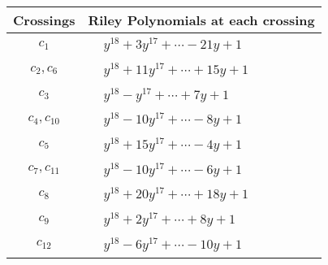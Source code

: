 \documentclass[1p]{elsarticle_modified}
\theoremstyle{definition}
\begin{document}
\begin{tabular}{m{50pt}|m{274pt}}
Crossings & \hspace{64pt}Riley Polynomials at each crossing \\
\hline $$\begin{aligned}c_{1}\end{aligned}$$&$\begin{aligned}
&y^{18}+3 y^{17}+\cdots-21 y+1
\end{aligned}$\\
\hline $$\begin{aligned}c_{2},c_{6}\end{aligned}$$&$\begin{aligned}
&y^{18}+11 y^{17}+\cdots+15 y+1
\end{aligned}$\\
\hline $$\begin{aligned}c_{3}\end{aligned}$$&$\begin{aligned}
&y^{18}- y^{17}+\cdots+7 y+1
\end{aligned}$\\
\hline $$\begin{aligned}c_{4},c_{10}\end{aligned}$$&$\begin{aligned}
&y^{18}-10 y^{17}+\cdots-8 y+1
\end{aligned}$\\
\hline $$\begin{aligned}c_{5}\end{aligned}$$&$\begin{aligned}
&y^{18}+15 y^{17}+\cdots-4 y+1
\end{aligned}$\\
\hline $$\begin{aligned}c_{7},c_{11}\end{aligned}$$&$\begin{aligned}
&y^{18}-10 y^{17}+\cdots-6 y+1
\end{aligned}$\\
\hline $$\begin{aligned}c_{8}\end{aligned}$$&$\begin{aligned}
&y^{18}+20 y^{17}+\cdots+18 y+1
\end{aligned}$\\
\hline $$\begin{aligned}c_{9}\end{aligned}$$&$\begin{aligned}
&y^{18}+2 y^{17}+\cdots+8 y+1
\end{aligned}$\\
\hline $$\begin{aligned}c_{12}\end{aligned}$$&$\begin{aligned}
&y^{18}-6 y^{17}+\cdots-10 y+1
\end{aligned}$\\
\hline
\end{tabular}\\~\\
\end{document}
